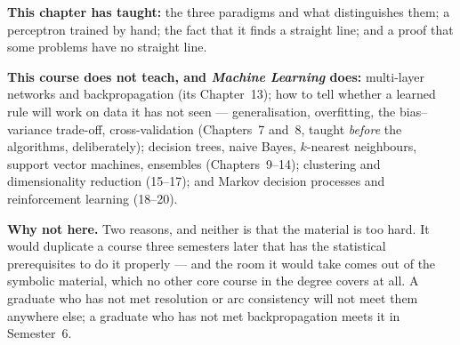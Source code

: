 \begin{alertbox}
\textbf{This chapter has taught:} the three paradigms and what distinguishes them; a
perceptron trained by hand; the fact that it finds a straight line; and a proof that
some problems have no straight line.

\textbf{This course does not teach, and \emph{Machine Learning} does:} multi-layer
networks and backpropagation (its Chapter~13); how to tell whether a learned rule
will work on data it has not seen --- generalisation, overfitting, the bias--variance
trade-off, cross-validation (Chapters~7 and~8, taught \emph{before} the algorithms,
deliberately); decision trees, naive Bayes, $k$-nearest neighbours, support vector
machines, ensembles (Chapters~9--14); clustering and dimensionality reduction
(15--17); and Markov decision processes and reinforcement learning (18--20).

\textbf{Why not here.} Two reasons, and neither is that the material is too hard.
It would duplicate a course three semesters later that has the statistical
prerequisites to do it properly --- and the room it would take comes out of the
symbolic material, which no other core course in the degree covers at all. A
graduate who has not met resolution or arc consistency will not meet them anywhere
else; a graduate who has not met backpropagation meets it in Semester~6.
\end{alertbox}

